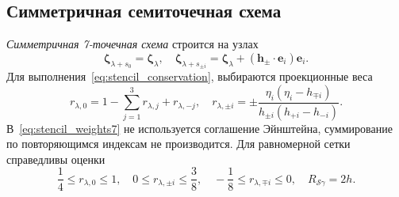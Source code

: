 \documentclass[a4paper,12pt]{article}
\newcommand{\bzeta}{\boldsymbol{\zeta}}
\newcommand{\bh}{\boldsymbol{h}}
\newcommand{\be}{\boldsymbol{e}}
\begin{document}
\subsection{Симметричная семиточечная схема}

\emph{Симметричная 7-точечная схема} строится на узлах
\begin{equation}\label{eq:stencil_nodes7}
    \bzeta_{\lambda+s_0} = \bzeta_{\lambda}, \quad
    \bzeta_{\lambda+s_{\pm i}} = \bzeta_{\lambda} + (\bh_\pm\cdot \be_i)\be_i.
\end{equation}
Для выполнения~\eqref{eq:stencil_conservation}, выбираются проекционные веса
\begin{equation}\label{eq:stencil_weights7}
    r_{\lambda,0} = 1 - \sum_{j=1}^3 r_{\lambda,j} + r_{\lambda,-j}, \quad
    r_{\lambda,\pm i} = \pm\frac{\eta_i(\eta_i - h_{\mp i})}{h_{\pm i}(h_{+i}-h_{-i})}.
\end{equation}
В~\eqref{eq:stencil_weights7} не используется соглашение Эйнштейна, суммирование по повторяющимся индексам не производится.
Для равномерной сетки справедливы оценки
\begin{equation}\label{eq:weights_ranges7}
    \frac14 \leq r_{\lambda,0} \leq 1, \quad
    0 \leq r_{\lambda,\pm i} \leq \frac38, \quad
    -\frac18 \leq r_{\lambda,\mp i} \leq 0, \quad
    R_{\mathcal{S}\gamma} = 2h.
\end{equation}
\end{document}
